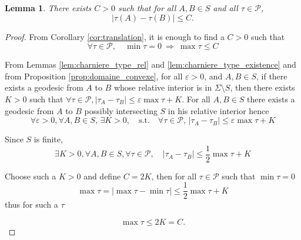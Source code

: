 \documentclass[a4paper,12pt]{article}
\def\adm{\P}
\def\adm{\mathcal{P}}
\def\P{\mathcal{P}}
\newtheorem{lem}{Lemma}[section]		 %
\theoremstyle{definition}
\begin{document}
				\begin{lem} \label{lem:admissible_compact}
					There exists $C>0$ such that for all $A,B\in S$ and all $\tau\in \adm$, $$|\tau(A)-\tau(B)|\leq C.$$

					\end{lem}
					\begin{proof}
						From Corollary \ref{cor:translation}, it is enough to find a $C>0$ such that 
						$$\forall \tau\in \adm,\quad \min\tau=0~\Rightarrow~ \max \tau\leq C$$
					
					From Lemmas \ref{lem:charniere_type_rel} and \ref{lem:charniere_type_existence} and from Proposition \ref{prop:domaine_convexe},
						for all $\varepsilon>0$, and $A,B\in S$, if there exists a geodesic from $A$ to $B$ whose relative interior is in $\Sigma\setminus S$, then there exists $K>0$ such that $\forall\tau\in \adm, \left|\tau_A-\tau_B\right| \leq \varepsilon \max \tau +K $.
						For all $A,B\in S$ there exists a geodesic from $A$ to $B$ possibly intersecting $S$ in his relative interior hence 
						$$\forall \varepsilon>0,\forall A,B\in S,\,\exists K>0,\quad \mathrm{s.t.}\quad \forall \tau \in \adm,\, |\tau_A-\tau_B|\leq \varepsilon \max \tau + K $$

						Since $S$ is finite, 
						$$\exists K>0,\forall A,B\in S,\forall \tau\in \adm,\quad |\tau_A-\tau_B|\leq \frac{1}{2}\max \tau +K$$

						Choose such a $K>0$ and define $C=2K$, then for all $\tau\in \adm$ such that $\min \tau=0$
						 $$\max \tau = |\max \tau-\min\tau| \leq \frac{1}{2} \max\tau +K $$
						thus for such a $\tau$
						
						$$\max \tau \leq 2K = C.$$\end{proof}
\end{document}
